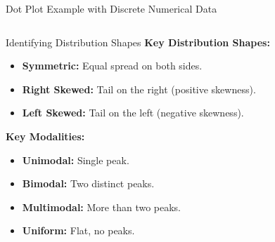 \documentclass[handout]{beamer} %
\begin{document}
\begin{frame}{Dot Plot Example with Discrete Numerical Data}
\begin{columns}[T,onlytextwidth]
\begin{column}{0.55\textwidth}
    \end{column}
\end{columns}

\end{frame}



\begin{frame}{Identifying Distribution Shapes}
    \textbf{Key Distribution Shapes:}
    \begin{itemize}
        \item \textbf{Symmetric:} Equal spread on both sides.
        \item \textbf{Right Skewed:} Tail on the right (positive skewness).
        \item \textbf{Left Skewed:} Tail on the left (negative skewness).
    \end{itemize}
    \vspace{0.5cm}
    \textbf{Key Modalities:}
    \begin{itemize}
        \item \textbf{Unimodal:} Single peak.
        \item \textbf{Bimodal:} Two distinct peaks.
        \item \textbf{Multimodal:} More than two peaks.
        \item \textbf{Uniform:} Flat, no peaks.
    \end{itemize}
\end{frame}
\end{document}

